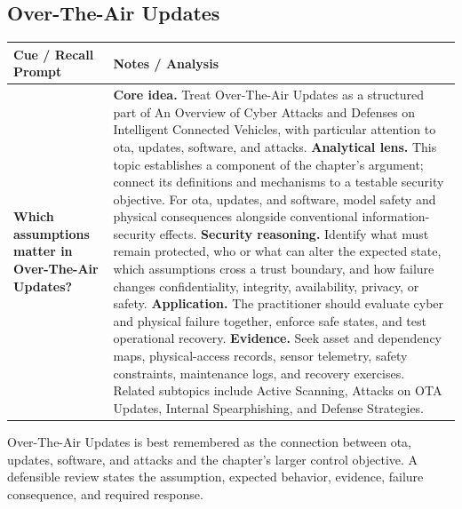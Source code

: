 \documentclass[11pt]{article}
\newcommand{\CornellHeader}{%
\rowcolor{Navy}\color{white}\bfseries Cue / Recall Prompt & \color{white}\bfseries Notes / Analysis\\\hline}
\newcommand{\CornellRow}[2]{%
\cellcolor{CueGray}\RaggedRight\textbf{#1} & \RaggedRight #2\\\hline}
\begin{document}
\subsection*{Over-The-Air Updates}
\begin{longtable}{>{\RaggedRight\arraybackslash}p{}|>{\RaggedRight\arraybackslash}p{}}
\CornellHeader
\CornellRow{Which assumptions matter in Over-The-Air Updates?}{\textbf{Core idea.} Treat Over-The-Air Updates as a structured part of An Overview of Cyber Attacks and Defenses on Intelligent Connected Vehicles, with particular attention to ota, updates, software, and attacks. \textbf{Analytical lens.} This topic establishes a component of the chapter's argument; connect its definitions and mechanisms to a testable security objective. For ota, updates, and software, model safety and physical consequences alongside conventional information-security effects. \textbf{Security reasoning.} Identify what must remain protected, who or what can alter the expected state, which assumptions cross a trust boundary, and how failure changes confidentiality, integrity, availability, privacy, or safety. \textbf{Application.} The practitioner should evaluate cyber and physical failure together, enforce safe states, and test operational recovery. \textbf{Evidence.} Seek asset and dependency maps, physical-access records, sensor telemetry, safety constraints, maintenance logs, and recovery exercises. Related subtopics include Active Scanning, Attacks on OTA Updates, Internal Spearphishing, and Defense Strategies.}
\end{longtable}
\begin{topicsummary}
Over-The-Air Updates is best remembered as the connection between ota, updates, software, and attacks and the chapter's larger control objective. A defensible review states the assumption, expected behavior, evidence, failure consequence, and required response.
\end{topicsummary}
\end{document}
